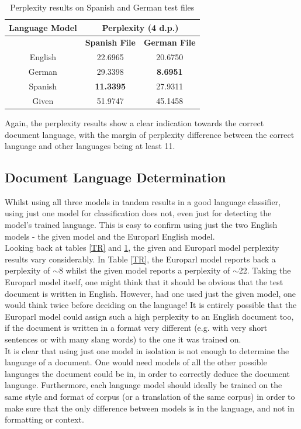 \documentclass[12pt]{article}
\begin{document}
\begin{table}[H]
	\centering
	\setlength\arrayrulewidth{1pt}
	\caption{\label{SR}Perplexity results on Spanish and German test files }
	\begin{tabular}{c c c}
		\hline
		\textbf{Language Model} & \multicolumn{2}{c}{\textbf{Perplexity (4 d.p.)} }\\
		\hline
		  & \textbf{Spanish File} & \textbf{German File} \\
		\hline                     
		English& 22.6965 & 20.6750\\
		German & 29.3398 & \textbf{8.6951}\\
		Spanish & \textbf{11.3395} & 27.9311\\
		Given & 51.9747& 45.1458\\
	\end{tabular}
\end{table}

Again, the perplexity results show a clear indication towards the correct document language, with the margin of perplexity difference between the correct language and other languages being at least 11. 

\subsection{Document Language Determination}

Whilst using all three models in tandem results in a good language classifier, using just one model for classification does not, even just for detecting the model's trained language.  This is easy to confirm using just the two English models - the given model and the Europarl English model.\\
\hfill\break
Looking back at tables \ref{TR} and \ref{SR}, the given and Europarl model perplexity results vary considerably.  In Table \ref{TR}, the Europarl model reports back a perplexity of $\sim$8 whilst the given model reports a perplexity of $\sim$22.  Taking the Europarl model itself, one might think that it should be obvious that the test document is written in English.  However, had one used just the given model, one would think twice before deciding on the language!  It is entirely possible that the Europarl model could assign such a high perplexity to an English document too, if the document is written in a format very different (e.g. with very short sentences or with many slang words) to the one it was trained on.\\
\hfill\break
It is clear that using just one model in isolation is not enough to determine the language of a document.  One would need models of all the other possible languages the document could be in, in order to correctly deduce the document language.  Furthermore, each language model should ideally be trained on the same style and format of corpus (or a translation of the same corpus) in order to make sure that the only difference between models is in the language, and not in formatting or context.  
\end{document}
